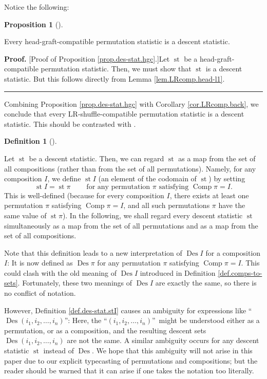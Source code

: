 \documentclass[numbers=enddot,12pt,final,onecolumn,notitlepage]{scrartcl}%
\theoremstyle{definition}
\newtheorem{prop}[theo]{Proposition}
\newenvironment{proposition}[1][]
{\begin{prop}[#1]\begin{leftbar}}
{\end{leftbar}\end{prop}}
\newtheorem{defi}[theo]{Definition}
\newenvironment{definition}[1][]
{\begin{defi}[#1]\begin{leftbar}}
{\end{leftbar}\end{defi}}
\newenvironment{proof}[1][Proof]{\noindent\textbf{#1.} }{\ \rule{0.5em}{0.5em}}
\begin{document}
Notice the following:

\begin{proposition}
\label{prop.des-stat.hgc}Every head-graft-compatible permutation statistic is
a descent statistic.
\end{proposition}

\begin{proof}
[Proof of Proposition \ref{prop.des-stat.hgc}.]Let $\operatorname*{st}$ be a
head-graft-compatible permutation statistic. Then, we must show that
$\operatorname*{st}$ is a descent statistic. But this follows directly from
Lemma \ref{lem.LRcomp.head-l1}.
\end{proof}

Combining Proposition \ref{prop.des-stat.hgc} with Corollary
\ref{cor.LRcomp.back}, we conclude that every LR-shuffle-compatible
permutation statistic is a descent statistic. This should be contrasted with
\cite[Conjecture 6.11]{part1}.

\begin{definition}
\label{def.des-stat.stI}Let $\operatorname*{st}$ be a descent statistic. Then,
we can regard $\operatorname*{st}$ as a map from the set of all compositions
(rather than from the set of all permutations). Namely, for any composition
$I$, we define $\operatorname*{st}I$ (an element of the codomain of
$\operatorname*{st}$) by setting%
\[
\operatorname*{st}I=\operatorname*{st}\pi\ \ \ \ \ \ \ \ \ \ \text{for any
permutation }\pi\text{ satisfying }\operatorname*{Comp}\pi=I.
\]
This is well-defined (because for every composition $I$, there exists at least
one permutation $\pi$ satisfying $\operatorname*{Comp}\pi=I$, and all such
permutations $\pi$ have the same value of $\operatorname*{st}\pi$). In the
following, we shall regard every descent statistic $\operatorname*{st}$
simultaneously as a map from the set of all permutations and as a map from the
set of all compositions.
\end{definition}

Note that this definition leads to a new interpretation of
$\operatorname*{Des}I$ for a composition $I$: It is now defined as
$\operatorname*{Des}\pi$ for any permutation $\pi$ satisfying
$\operatorname*{Comp}\pi=I$. This could clash with the old meaning of
$\operatorname*{Des}I$ introduced in Definition \ref{def.comps-to-sets}.
Fortunately, these two meanings of $\operatorname*{Des}I$ are exactly the
same, so there is no conflict of notation.

However, Definition \ref{def.des-stat.stI} causes an ambiguity for expressions
like \textquotedblleft$\operatorname*{Des}\left(  i_{1},i_{2},\ldots
,i_{n}\right)  $\textquotedblright: Here, the \textquotedblleft$\left(
i_{1},i_{2},\ldots,i_{n}\right)  $\textquotedblright\ might be understood
either as a permutation, or as a composition, and the resulting descent sets
$\operatorname*{Des}\left(  i_{1},i_{2},\ldots,i_{n}\right)  $ are not the
same. A similar ambiguity occurs for any descent statistic $\operatorname*{st}%
$ instead of $\operatorname*{Des}$. We hope that this ambiguity will not arise
in this paper due to our explicit typecasting of permutations and
compositions; but the reader should be warned that it can arise if one takes
the notation too literally.
\end{document}
